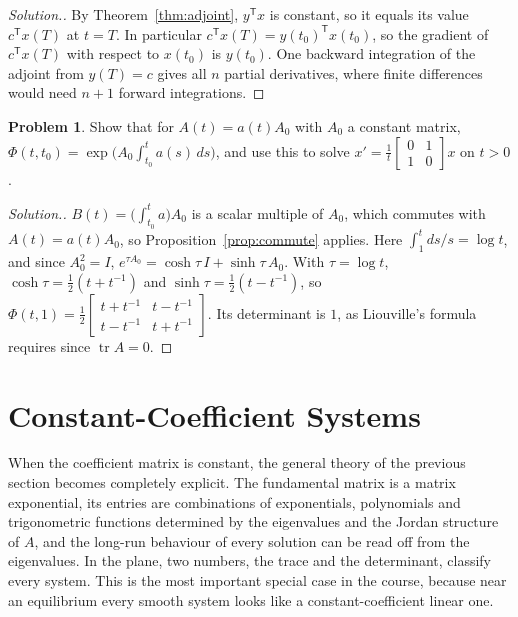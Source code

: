 \documentclass[11pt,a4paper]{article}
\numberwithin{equation}{section}
\DeclareMathOperator{\tr}{tr}
\theoremstyle{definition}
\newtheorem{problemx}{Problem}[subsection]
\newenvironment{problem}{\begin{problemx}}{\end{problemx}}
\newenvironment{solution}
  {\renewcommand{\qedsymbol}{}\begin{proof}[\textit{Solution}.]}
  {\end{proof}}
\begin{document}
\begin{solution}
By Theorem~\ref{thm:adjoint}, $y^{\mathsf T}x$ is constant, so it equals its value $c^{\mathsf T}x(T)$ at $t = T$. In particular $c^{\mathsf T}x(T) = y(t_0)^{\mathsf T}x(t_0)$, so the gradient of $c^{\mathsf T}x(T)$ with respect to $x(t_0)$ is
$y(t_0)$. One backward integration of the adjoint from $y(T) = c$ gives all $n$ partial derivatives, where finite differences would need $n + 1$ forward integrations.
\end{solution}

\begin{problem}
Show that for $A(t) = a(t)A_0$ with $A_0$ a constant matrix, $\Phi(t, t_0) = \exp\bigl(A_0\int_{t_0}^ta(s)\,ds\bigr)$, and use this to solve $x' = \frac1t\begin{bmatrix} 0 & 1\\ 1 & 0\end{bmatrix}x$ on $t > 0$.
\end{problem}

\begin{solution}
$B(t) = \bigl(\int_{t_0}^ta\bigr)A_0$ is a scalar multiple of $A_0$, which commutes with $A(t) = a(t)A_0$, so Proposition~\ref{prop:commute} applies. Here $\int_1^tds/s = \log t$, and since $A_0^2 = I$,
$e^{\tau A_0} = \cosh\tau\,I + \sinh\tau\,A_0$. With $\tau = \log t$, $\cosh\tau = \frac12(t + t^{-1})$ and $\sinh\tau = \frac12(t - t^{-1})$, so $\Phi(t, 1) = \frac12\begin{bmatrix} t + t^{-1} & t - t^{-1}\\ t - t^{-1} & t + t^{-1}\end{bmatrix}$. Its
determinant is $1$, as Liouville's formula requires since $\tr A = 0$.
\end{solution}

\section{Constant-Coefficient Systems}
\label{sec:constcoef}

When the coefficient matrix is constant, the general theory of the previous section becomes completely explicit. The fundamental matrix is a matrix
exponential, its entries are combinations of exponentials, polynomials and trigonometric functions determined by the eigenvalues and the Jordan
structure of $A$, and the long-run behaviour of every solution can be read off from the eigenvalues. In the plane, two numbers, the trace and the
determinant, classify every system. This is the most important special case in the course, because near an equilibrium every smooth system looks
like a constant-coefficient linear one.
\end{document}
